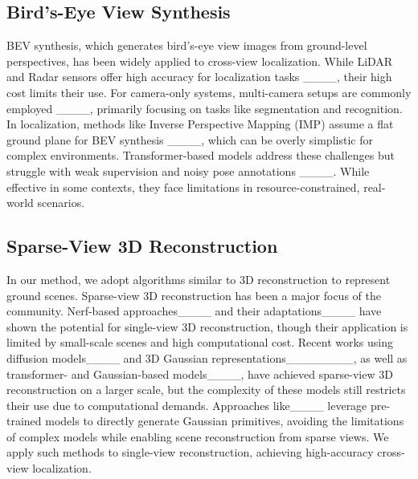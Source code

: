 \subsection{Bird’s-Eye View Synthesis}
BEV synthesis, which generates bird’s-eye view images from ground-level perspectives, has been widely applied to cross-view localization. While LiDAR and Radar sensors offer high accuracy for localization tasks ____, their high cost limits their use. For camera-only systems, multi-camera setups are commonly employed ____, primarily focusing on tasks like segmentation and recognition. In localization, methods like Inverse Perspective Mapping (IMP) assume a flat ground plane for BEV synthesis ____, which can be overly simplistic for complex environments. Transformer-based models address these challenges but struggle with weak supervision and noisy pose annotations ____. While effective in some contexts, they face limitations in resource-constrained, real-world scenarios.

\subsection{Sparse-View 3D Reconstruction}
In our method, we adopt algorithms similar to 3D reconstruction to represent ground scenes. Sparse-view 3D reconstruction has been a major focus of the community. Nerf-based approaches____ and their adaptations____ have shown the potential for single-view 3D reconstruction, though their application is limited by small-scale scenes and high computational cost. Recent works using diffusion models____ and 3D Gaussian representations________, as well as transformer- and Gaussian-based models____, have achieved sparse-view 3D reconstruction on a larger scale, but the complexity of these models still restricts their use due to computational demands. Approaches like____ leverage pre-trained models to directly generate Gaussian primitives, avoiding the limitations of complex models while enabling scene reconstruction from sparse views. We apply such methods to single-view reconstruction, achieving high-accuracy cross-view localization.